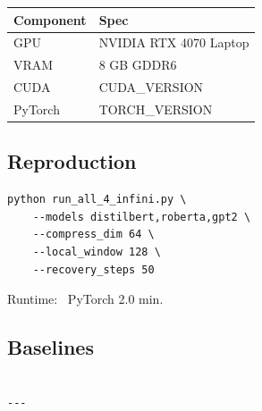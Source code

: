 \begin{table}[H]
\centering
\small
\begin{tabular}{ll}
\toprule
\textbf{Component} & \textbf{Spec} \\
\midrule
GPU & NVIDIA RTX 4070 Laptop \\
VRAM & 8 GB GDDR6 \\
CUDA & {{CUDA\_VERSION}} \\
PyTorch & {{TORCH\_VERSION}} \\
\bottomrule
\end{tabular}
\end{table}

\subsection{Reproduction}

\begin{lstlisting}
python run_all_4_infini.py \
    --models distilbert,roberta,gpt2 \
    --compress_dim 64 \
    --local_window 128 \
    --recovery_steps 50
\end{lstlisting}

Runtime: ~PyTorch 2.0 min.

\subsection{Baselines}

\begin{lstlisting}

---
\end{lstlisting}